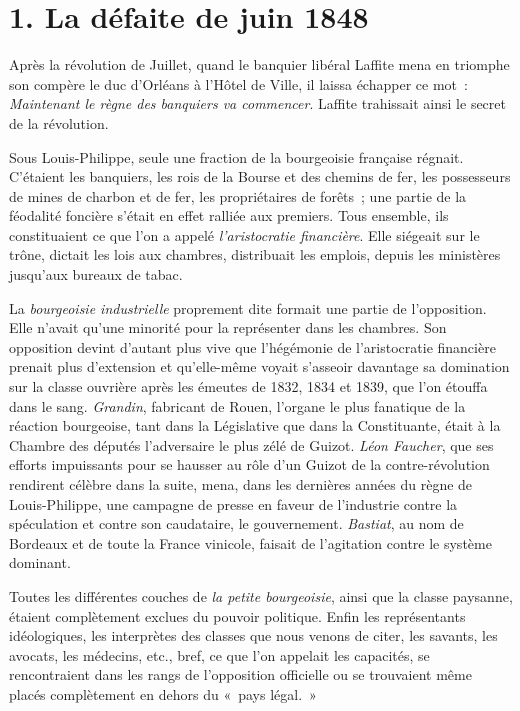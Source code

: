 \documentclass[french,twoside]{book} %
\begin{document}
\section[{1. La défaite de juin 1848}]{1. La défaite de juin 1848}

\noindent Après la révolution de Juillet, quand le banquier libéral Laffite mena en triomphe son compère le duc d’Orléans à l’Hôtel de Ville, il laissa échapper ce mot : \emph{Maintenant le règne des banquiers va commencer}. Laffite trahissait ainsi le secret de la révolution.\par
Sous Louis-Philippe, seule une fraction de la bourgeoisie française régnait. C’étaient les banquiers, les rois de la Bourse et des chemins de fer, les possesseurs de mines de charbon et de fer, les propriétaires de forêts ; une partie de la féodalité foncière s’était en effet ralliée aux premiers. Tous ensemble, ils constituaient ce que l’on a appelé \emph{l’aristocratie financière}. Elle siégeait sur le trône, dictait les lois aux chambres, distribuait les emplois, depuis les ministères jusqu’aux bureaux de tabac.\par
La \emph{bourgeoisie industrielle} proprement dite formait une partie de l’opposition. Elle n’avait qu’une minorité pour la représenter dans les chambres. Son opposition devint d’autant plus vive que l’hégémonie de l’aristocratie financière prenait plus d’extension et qu’elle-même voyait s’asseoir davantage sa domination sur la classe ouvrière après les émeutes de 1832, 1834 et 1839, que l’on étouffa dans le sang. \emph{Grandin}, fabricant de Rouen, l’organe le plus fanatique de la réaction bourgeoise, tant dans la Législative que dans la Constituante, était à la Chambre des députés l’adversaire le plus zélé de Guizot. \emph{Léon Faucher}, que ses efforts impuissants pour se hausser au rôle d’un Guizot de la contre-révolution rendirent célèbre dans la suite, mena, dans les dernières années du règne de Louis-Philippe, une campagne de presse en faveur de l’industrie contre la spéculation et contre son caudataire, le gouvernement. \emph{Bastiat}, au nom de Bordeaux et de toute la France vinicole, faisait de l’agitation contre le système dominant.\par
Toutes les différentes couches de \emph{la petite bourgeoisie}, ainsi que la classe paysanne, étaient complètement exclues du pouvoir politique. Enfin les représentants idéologiques, les interprètes des classes que nous venons de citer, les savants, les avocats, les médecins, etc., bref, ce que l’on appelait les capacités, se rencontraient dans les rangs de l’opposition officielle ou se trouvaient même placés complètement en dehors du « pays légal. »\par
\end{document}

